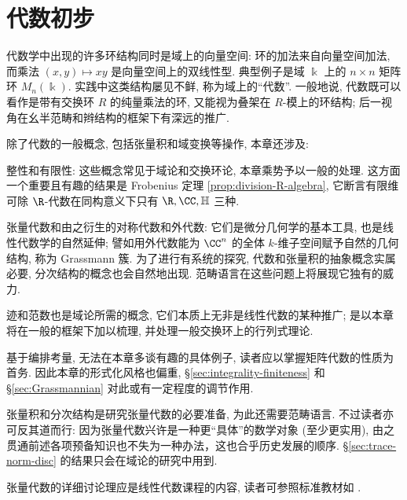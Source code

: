 
\chapter{代数初步}\label{sec:algebras}
代数学中出现的许多环结构同时是域上的向量空间: 环的加法来自向量空间加法, 而乘法 $(x,y) \mapsto xy$ 是向量空间上的双线性型. 典型例子是域 $\Bbbk$ 上的 $n \times n$ 矩阵环 $M_n(\Bbbk)$. 实践中这类结构屡见不鲜, 称为域上的``代数''. 一般地说, 代数既可以看作是带有交换环 $R$ 的纯量乘法的环, 又能视为叠架在 $R$-模上的环结构; 后一视角在幺半范畴和辫结构的框架下有深远的推广.

除了代数的一般概念, 包括张量积和域变换等操作, 本章还涉及:
\begin{compactenum}
	\item 整性和有限性: 这些概念常见于域论和交换环论, 本章乘势予以一般的处理. 这方面一个重要且有趣的结果是 Frobenius 定理 \ref{prop:division-R-algebra}, 它断言有限维可除 $\R$-代数在同构意义下只有 $\R, \CC, \mathbb{H}$ 三种.
	\item 张量代数和由之衍生的对称代数和外代数: 它们是微分几何学的基本工具, 也是线性代数学的自然延伸; 譬如用外代数能为 $\CC^n$ 的全体 $k$-维子空间赋予自然的几何结构, 称为 Grassmann 簇. 为了进行有系统的探究, 代数和张量积的抽象概念实属必要, 分次结构的概念也会自然地出现. 范畴语言在这些问题上将展现它独有的威力.
	\item 迹和范数也是域论所需的概念, 它们本质上无非是线性代数的某种推广; 是以本章将在一般的框架下加以梳理, 并处理一般交换环上的行列式理论.
\end{compactenum}

\begin{wenxintishi}
	基于编排考量, 无法在本章多谈有趣的具体例子, 读者应以掌握矩阵代数的性质为首务. 因此本章的形式化风格也偏重, \S\ref{sec:integrality-finiteness} 和 \S\ref{sec:Grassmannian} 对此或有一定程度的调节作用. 

	张量积和分次结构是研究张量代数的必要准备, 为此还需要范畴语言. 不过读者亦可反其道而行: 因为张量代数兴许是一种更``具体''的数学对象 (至少更实用), 由之贯通前述各项预备知识也不失为一种办法，这也合乎历史发展的顺序. \S\ref{sec:trace-norm-disc} 的结果只会在域论的研究中用到.
	
	张量代数的详细讨论理应是线性代数课程的内容, 读者可参照标准教材如 \cite[第六章]{Xi18}.
\end{wenxintishi}

